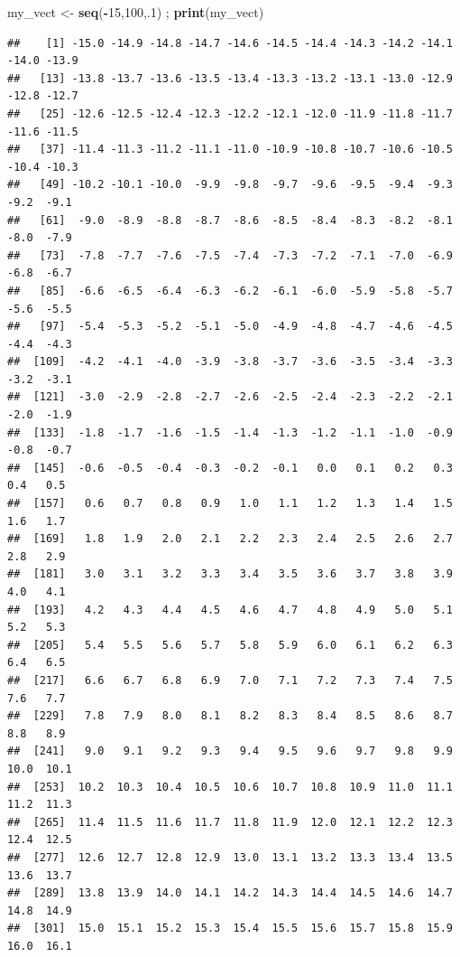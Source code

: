 \documentclass[
]{book}
\newenvironment{Shaded}{\begin{snugshade}}{\end{snugshade}}
\newcommand{\DecValTok}[1]{\textcolor[rgb]{0.00,0.00,0.81}{#1}}
\newcommand{\KeywordTok}[1]{\textcolor[rgb]{0.13,0.29,0.53}{\textbf{#1}}}
\newcommand{\NormalTok}[1]{#1}
\newcommand{\OperatorTok}[1]{\textcolor[rgb]{0.81,0.36,0.00}{\textbf{#1}}}
\newcommand{\StringTok}[1]{\textcolor[rgb]{0.31,0.60,0.02}{#1}}
\begin{document}
\begin{Shaded}
\begin{Highlighting}[]
\NormalTok{my_vect <-}\StringTok{ }\KeywordTok{seq}\NormalTok{(}\OperatorTok{-}\DecValTok{15}\NormalTok{,}\DecValTok{100}\NormalTok{,.}\DecValTok{1}\NormalTok{) ; }\KeywordTok{print}\NormalTok{(my_vect)}
\end{Highlighting}
\end{Shaded}

\begin{verbatim}
##    [1] -15.0 -14.9 -14.8 -14.7 -14.6 -14.5 -14.4 -14.3 -14.2 -14.1 -14.0 -13.9
##   [13] -13.8 -13.7 -13.6 -13.5 -13.4 -13.3 -13.2 -13.1 -13.0 -12.9 -12.8 -12.7
##   [25] -12.6 -12.5 -12.4 -12.3 -12.2 -12.1 -12.0 -11.9 -11.8 -11.7 -11.6 -11.5
##   [37] -11.4 -11.3 -11.2 -11.1 -11.0 -10.9 -10.8 -10.7 -10.6 -10.5 -10.4 -10.3
##   [49] -10.2 -10.1 -10.0  -9.9  -9.8  -9.7  -9.6  -9.5  -9.4  -9.3  -9.2  -9.1
##   [61]  -9.0  -8.9  -8.8  -8.7  -8.6  -8.5  -8.4  -8.3  -8.2  -8.1  -8.0  -7.9
##   [73]  -7.8  -7.7  -7.6  -7.5  -7.4  -7.3  -7.2  -7.1  -7.0  -6.9  -6.8  -6.7
##   [85]  -6.6  -6.5  -6.4  -6.3  -6.2  -6.1  -6.0  -5.9  -5.8  -5.7  -5.6  -5.5
##   [97]  -5.4  -5.3  -5.2  -5.1  -5.0  -4.9  -4.8  -4.7  -4.6  -4.5  -4.4  -4.3
##  [109]  -4.2  -4.1  -4.0  -3.9  -3.8  -3.7  -3.6  -3.5  -3.4  -3.3  -3.2  -3.1
##  [121]  -3.0  -2.9  -2.8  -2.7  -2.6  -2.5  -2.4  -2.3  -2.2  -2.1  -2.0  -1.9
##  [133]  -1.8  -1.7  -1.6  -1.5  -1.4  -1.3  -1.2  -1.1  -1.0  -0.9  -0.8  -0.7
##  [145]  -0.6  -0.5  -0.4  -0.3  -0.2  -0.1   0.0   0.1   0.2   0.3   0.4   0.5
##  [157]   0.6   0.7   0.8   0.9   1.0   1.1   1.2   1.3   1.4   1.5   1.6   1.7
##  [169]   1.8   1.9   2.0   2.1   2.2   2.3   2.4   2.5   2.6   2.7   2.8   2.9
##  [181]   3.0   3.1   3.2   3.3   3.4   3.5   3.6   3.7   3.8   3.9   4.0   4.1
##  [193]   4.2   4.3   4.4   4.5   4.6   4.7   4.8   4.9   5.0   5.1   5.2   5.3
##  [205]   5.4   5.5   5.6   5.7   5.8   5.9   6.0   6.1   6.2   6.3   6.4   6.5
##  [217]   6.6   6.7   6.8   6.9   7.0   7.1   7.2   7.3   7.4   7.5   7.6   7.7
##  [229]   7.8   7.9   8.0   8.1   8.2   8.3   8.4   8.5   8.6   8.7   8.8   8.9
##  [241]   9.0   9.1   9.2   9.3   9.4   9.5   9.6   9.7   9.8   9.9  10.0  10.1
##  [253]  10.2  10.3  10.4  10.5  10.6  10.7  10.8  10.9  11.0  11.1  11.2  11.3
##  [265]  11.4  11.5  11.6  11.7  11.8  11.9  12.0  12.1  12.2  12.3  12.4  12.5
##  [277]  12.6  12.7  12.8  12.9  13.0  13.1  13.2  13.3  13.4  13.5  13.6  13.7
##  [289]  13.8  13.9  14.0  14.1  14.2  14.3  14.4  14.5  14.6  14.7  14.8  14.9
##  [301]  15.0  15.1  15.2  15.3  15.4  15.5  15.6  15.7  15.8  15.9  16.0  16.1

\end{verbatim}
\end{document}
